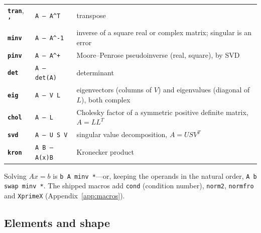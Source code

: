 \documentclass[11pt,letterpaper]{article}
\newcommand{\code}[1]{\texttt{#1}}
\newcommand{\cmd}[1]{\texttt{\textbf{#1}}}
\newcommand{\stk}[1]{\texttt{#1}}
\begin{document}
\begin{center}
\begin{tabular}{@{}llp{}@{}}
\toprule
\cmd{tran}, \cmd{'} & \stk{A -- A\textasciicircum T} & transpose \\
\cmd{minv} & \stk{A -- A\textasciicircum -1} & inverse of a square real or complex matrix; singular is an error \\
\cmd{pinv} & \stk{A -- A\textasciicircum +}  & Moore--Penrose pseudoinverse (real, square), by SVD \\
\cmd{det}  & \stk{A -- det(A)} & determinant \\
\cmd{eig}  & \stk{A -- V L}    & eigenvectors (columns of $V$) and eigenvalues (diagonal of $L$), both complex \\
\cmd{chol} & \stk{A -- L}      & Cholesky factor of a symmetric positive definite matrix, $A = LL^T$ \\
\cmd{svd}  & \stk{A -- U S V}  & singular value decomposition, $A = U S V^T$ \\
\cmd{kron} & \stk{A B -- A(x)B} & Kronecker product \\
\bottomrule
\end{tabular}
\end{center}
Solving $Ax = b$ is \code{b A minv *}---or, keeping the operands in the natural order, \code{A b swap minv *}. The shipped macros add \code{cond} (condition number), \code{norm2}, \code{normfro} and \code{XprimeX} (Appendix~\ref{app:macros}).

\subsection{Elements and shape}
\end{document}
